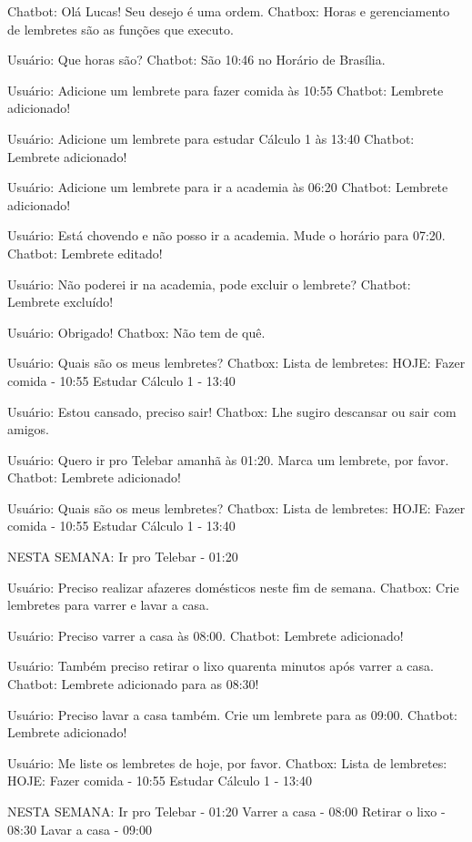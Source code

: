 Chatbot: Olá Lucas! Seu desejo é uma ordem.
Chatbox: Horas e gerenciamento de lembretes são as funções que executo.

Usuário: Que horas são?
Chatbot: São 10:46 no Horário de Brasília.

Usuário: Adicione um lembrete para fazer comida às 10:55
Chatbot: Lembrete adicionado!

Usuário: Adicione um lembrete para estudar Cálculo 1 às 13:40
Chatbot: Lembrete adicionado!

Usuário: Adicione um lembrete para ir a academia às 06:20
Chatbot: Lembrete adicionado!

Usuário: Está chovendo e não posso ir a academia. Mude o horário para 07:20.
Chatbot: Lembrete editado!

Usuário: Não poderei ir na academia, pode excluir o lembrete?
Chatbot: Lembrete excluído!

Usuário: Obrigado!
Chatbox: Não tem de quê.

Usuário: Quais são os meus lembretes?
Chatbox: Lista de lembretes:
	HOJE:
	Fazer comida - 10:55
	Estudar Cálculo 1 - 13:40

Usuário: Estou cansado, preciso sair!
Chatbox: Lhe sugiro descansar ou sair com amigos.

Usuário: Quero ir pro Telebar amanhã às 01:20. Marca um lembrete, por favor.
Chatbot: Lembrete adicionado!

Usuário: Quais são os meus lembretes?
Chatbox: Lista de lembretes:
	HOJE:
	Fazer comida - 10:55
	Estudar Cálculo 1 - 13:40

	NESTA SEMANA:
	Ir pro Telebar - 01:20

Usuário: Preciso realizar afazeres domésticos neste fim de semana.
Chatbox: Crie lembretes para varrer e lavar a casa.

Usuário: Preciso varrer a casa às 08:00.
Chatbot: Lembrete adicionado!

Usuário: Também preciso retirar o lixo quarenta minutos após varrer a casa.
Chatbot: Lembrete adicionado para as 08:30!

Usuário: Preciso lavar a casa também. Crie um lembrete para as 09:00.
Chatbot: Lembrete adicionado!

Usuário: Me liste os lembretes de hoje, por favor.
Chatbox: Lista de lembretes:
	HOJE:
	Fazer comida - 10:55
	Estudar Cálculo 1 - 13:40

	NESTA SEMANA:
	Ir pro Telebar - 01:20
	Varrer a casa - 08:00
	Retirar o lixo - 08:30
	Lavar a casa - 09:00

